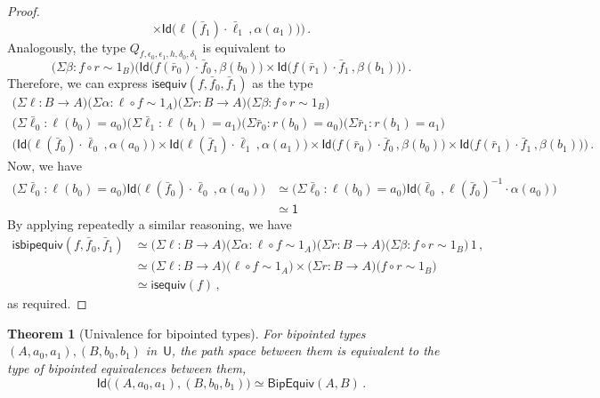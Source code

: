 \documentclass[reqno,10pt,a4paper,oneside]{amsart}
\numberwithin{equation}{section}
\theoremstyle{mythm}
\newtheorem{theorem}{Theorem}[subsection]
\theoremstyle{mydef}
\theoremstyle{myrmk}
\newcommand{\ie}{\text{i.e.\ }}
\newcommand{\co}{\colon}
\newcommand{\comp}{\circ}
\newcommand{\isequiv}{\mathsf{isequiv}}
\newcommand{\ct}{\cdot}
\newcommand{\Id}{\mathsf{Id}}
\newcommand{\one}{\mathsf{1}}
\newcommand{\UU}{\mathsf{U}}
\begin{document}
\begin{proof}
\[\times 
\Id \big( \ell(\bar{f}_1) \ct \bar{\ell}_1 \, ,  \alpha(a_1) \big)
\Big) \, .
\]
Analogously, the type $Q_{f,\epsilon_0,\epsilon_1,h,\delta_0,\delta_1}$ is equivalent to
\[
\big(\Sigma \beta : f \comp r \sim 1_B \big) 
\Big(
\Id  \big( f (\bar{r}_0) \ct \bar{f}_0 \, ,  \beta(b_0) \big) 
\times 
\Id \big( f(\bar{r}_1) \ct \bar{f}_1 \, ,  \beta(b_1) \big)
\Big) \, .
\]
Therefore, we can express $\isequiv(f, \bar{f}_0, \bar{f}_1)$ as the type
\begin{multline*}
 \big(\Sigma \ell \co B \to  A \big) \big(\Sigma \alpha : \ell \comp f \sim 1_A \big) 
  \big(\Sigma r \co B \to A \big) \big(\Sigma \beta : f \comp r \sim 1_B \big)  \\
 \big(\Sigma \bar{\ell}_0 : \ell(b_0)=a_0 \big) \big(\Sigma \bar{\ell}_1 : \ell(b_1)=a_1\big) \big(\Sigma \bar{r}_0 : r(b_0)=a_0 \big) \big(\Sigma \bar{r}_1 : r(b_1)=a_1\big)  \\
  \Big(
\Id  \big( \ell (\bar{f}_0) \ct \bar{\ell}_0 \, ,  \alpha(a_0) \big) 
\times 
\Id \big( \ell(\bar{f}_1) \ct \bar{\ell}_1 \, ,  \alpha(a_1) \big)
  \times 
\Id  \big( f (\bar{r}_0) \ct \bar{f}_0 \, ,  \beta(b_0) \big) 
\times 
\Id \big( f(\bar{r}_1) \ct \bar{f}_1 \, ,  \beta(b_1) \big)
\Big) \, .
\end{multline*}
Now, we have
\begin{align*} 
\big(  \Sigma \bar{\ell}_0 : \ell(b_0) = a_0 \big) \Id \big(  \ell(\bar{f}_0) \ct \bar{\ell}_0 \, ,  \alpha(a_0) \big)
   & \simeq  \big(\Sigma \bar{\ell}_0 : \ell(b_0) = a_0 \big) \Id \big( \bar{\ell}_0 \, ,  \ell(\bar{f}_0)^{-1} \ct \alpha(a_0)  \big)
                            \\
   & \simeq  \one
\end{align*} 
By applying repeatedly a similar reasoning, we have 
\begin{align*} 
\mathsf{isbipequiv}(f,\bar{f}_0, \bar{f}_1) 
  & \simeq   \big(\Sigma \ell \co B \to A \big) \big(\Sigma \alpha : \ell \comp f \sim 1_A \big) \big(\Sigma r  \co B \to A \big) 
 \big(\Sigma \beta \co f \comp r \sim 1_B \big) \, 1  \, , \\
 & \simeq \big(\Sigma \ell \co B \to A \big)  \big( \ell \comp f \sim 1_A \big) \times 
 \big(\Sigma r  \co B \to A \big) \big( f \comp r \sim 1_B \big) \\
 & \simeq \isequiv(f) \, ,
\end{align*} 
as required.
\end{proof}

\begin{theorem}[Univalence for bipointed types] \label{thm:bipunivalence}
 For bipointed types $(A, a_0, a_1), (B, b_0, b_1)$ in~$\UU$, the path space between them is equivalent to the type of bipointed equivalences between them, \ie 
\[ 
\Id \big( (A, a_0, a_1) , (B, b_0, b_1)\big) \simeq  \mathsf{BipEquiv}(A,B) \, .
\] 
\end{theorem} 
\end{document}
